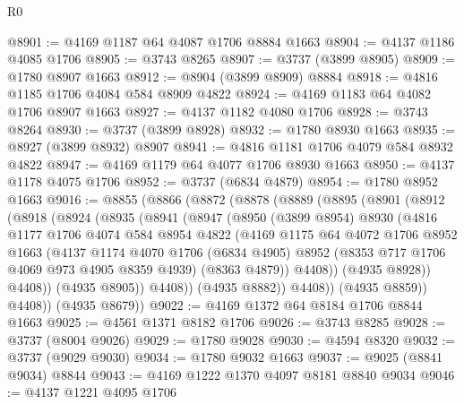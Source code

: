 \begin{lexlean}{R0}
\begin{coremodule}
@8901 := @4169 @1187 @64 @4087 @1706 @8884 @1663
@8904 := @4137 @1186 @4085 @1706
@8905 := @3743 @8265
@8907 := @3737 (@3899 @8905)
@8909 := @1780 @8907 @1663
@8912 := @8904 (@3899 @8909) @8884
@8918 := @4816 @1185 @1706 @4084 @584 @8909 @4822
@8924 := @4169 @1183 @64 @4082 @1706 @8907 @1663
@8927 := @4137 @1182 @4080 @1706
@8928 := @3743 @8264
@8930 := @3737 (@3899 @8928)
@8932 := @1780 @8930 @1663
@8935 := @8927 (@3899 @8932) @8907
@8941 := @4816 @1181 @1706 @4079 @584 @8932 @4822
@8947 := @4169 @1179 @64 @4077 @1706 @8930 @1663
@8950 := @4137 @1178 @4075 @1706
@8952 := @3737 (@6834 @4879)
@8954 := @1780 @8952 @1663
@9016 := @8855
    (@8866
      (@8872
        (@8878
          (@8889
            (@8895
              (@8901
                (@8912
                  (@8918
                    (@8924
                      (@8935
                        (@8941
                          (@8947
                            (@8950
                              (@3899 @8954)
                              @8930
                              (@4816
                                @1177
                                @1706
                                @4074
                                @584
                                @8954
                                @4822
                                (@4169
                                  @1175
                                  @64
                                  @4072
                                  @1706
                                  @8952
                                  @1663
                                  (@4137
                                    @1174
                                    @4070
                                    @1706
                                    (@6834 @4905)
                                    @8952
                                    (@8353 @717 @1706 @4069 @973 @4905 @8359 @4939)
                                    (@8363 @4879))
                                  @4408))
                              (@4935 @8928))
                            @4408))
                        (@4935 @8905))
                      @4408))
                  (@4935 @8882))
                @4408))
            (@4935 @8859))
          @4408))
      (@4935 @8679))
@9022 := @4169 @1372 @64 @8184 @1706 @8844 @1663
@9025 := @4561 @1371 @8182 @1706
@9026 := @3743 @8285
@9028 := @3737 (@8004 @9026)
@9029 := @1780 @9028
@9030 := @4594 @8320
@9032 := @3737 (@9029 @9030)
@9034 := @1780 @9032 @1663
@9037 := @9025 (@8841 @9034) @8844
@9043 := @4169 @1222 @1370 @4097 @8181 @8840 @9034
@9046 := @4137 @1221 @4095 @1706

\end{coremodule}
\end{lexlean}
